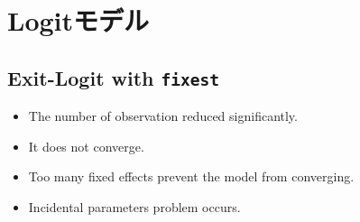 \documentclass[
]{article}
\providecommand{\tightlist}{%
  \setlength{\itemsep}{0pt}\setlength{\parskip}{0pt}}
\begin{document}
\hypertarget{logitux30e2ux30c7ux30eb}{%
\section{Logitモデル}\label{logitux30e2ux30c7ux30eb}}

\hypertarget{exit-logit-with-fixest}{%
\subsection{\texorpdfstring{Exit-Logit with
\texttt{fixest}}{Exit-Logit with fixest}}\label{exit-logit-with-fixest}}

\begin{itemize}
\tightlist
\item
  The number of observation reduced significantly.
\item
  It does not converge.
\item
  Too many fixed effects prevent the model from converging.
\item
  Incidental parameters problem occurs.
\end{itemize}
\end{document}
